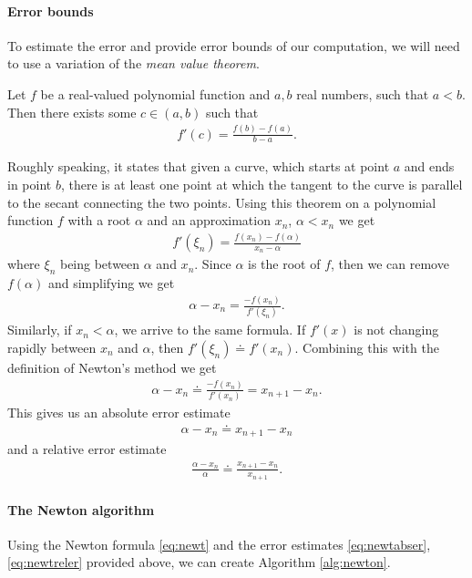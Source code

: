 \documentclass[
  digital, %
  table,   %
  nolof,     %
  nolot,     %
	draft, %
]{fithesis3}
\begin{document}
\paragraph{Error bounds}
To estimate the error and provide error bounds of our computation, we will need to use a variation of the \emph{mean value theorem}.
\begin{theorem}
Let $f$ be a real-valued polynomial function and $a, b$ real numbers, such that $a < b$. Then there exists some $c\in(a, b)$ such that
\begin{align}
f'(c) = \frac{f(b) - f(a)}{b - a}.
\end{align}
\end{theorem}%
Roughly speaking, it states that given a curve, which starts at point $a$ and ends in point $b$, there is at least one point at which the tangent to the curve is parallel to the secant connecting the two points.
Using this theorem on a polynomial function $f$ with a root $\alpha$ and an approximation $x_{n}$, $\alpha < x_{n}$ we get 
\begin{align}
f'(\xi_n) = \frac{f(x_{n})-f(\alpha)}{x_{n}-\alpha}
\end{align}
where $\xi_{n}$ being between $\alpha$ and $x_{n}$. Since $\alpha$ is the root of $f$, then we can remove $f(\alpha)$ and simplifying we get
\begin{align}
\alpha - x_{n} = \frac{-f(x_{n})}{f'(\xi_n)}.
\end{align}
Similarly, if $x_{n} < \alpha$, we arrive to the same formula. If $f'(x)$ is not changing rapidly between $x_{n}$ and $\alpha$, then $f'(\xi_{n}) \doteq f'(x_{n})$. Combining this with the definition of Newton's method we get
\begin{align}
\alpha - x_{n} \doteq \frac{-f(x_{n})}{f'(x_{n})} = x_{n+1} - x_{n}.
\end{align}
This gives us an absolute error estimate
\begin{align}
\alpha - x_{n} \doteq x_{n+1} - x_{n} \label{eq:newtabser}
\end{align}
and a relative error estimate
\begin{align}
\frac{\alpha - x_{n}}{\alpha} \doteq \frac{x_{n+1} - x_{n}}{x_{n+1}}.\label{eq:newtreler}
\end{align}
\paragraph{The Newton algorithm}
Using the Newton formula \eqref{eq:newt} and the error estimates \eqref{eq:newtabser}, \eqref{eq:newtreler} provided above, we can create  Algorithm \ref{alg:newton}.
\end{document}
